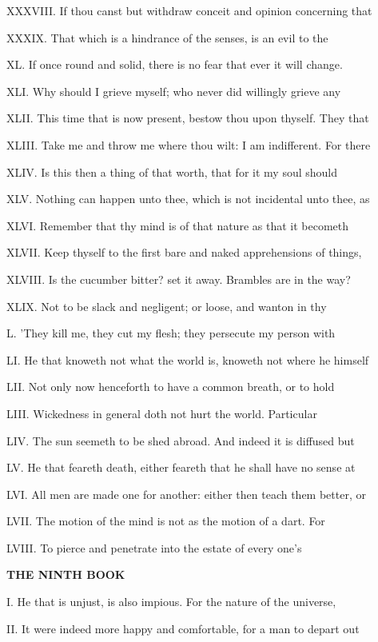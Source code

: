 XXXVIII. If thou canst but withdraw conceit
and opinion concerning that

XXXIX. That which is a hindrance of the
senses, is an evil to the

XL. If once round and solid, there is no fear
that ever it will change.

XLI. Why should I grieve myself; who never did
willingly grieve any

XLII. This time that is now present, bestow
thou upon thyself. They that

XLIII. Take me and throw me where thou wilt: I
am indifferent. For there

XLIV. Is this then a thing of that worth, that
for it my soul should

XLV. Nothing can happen unto thee, which is
not incidental unto thee, as

XLVI. Remember that thy mind is of that nature
as that it becometh

XLVII. Keep thyself to the first bare and
naked apprehensions of things,

XLVIII. Is the cucumber bitter? set it away.
Brambles are in the way?

XLIX. Not to be slack and negligent; or loose,
and wanton in thy

L. 'They kill me, they cut my flesh; they
persecute my person with

LI. He that knoweth not what the world is,
knoweth not where he himself

LII. Not only now henceforth to have a common
breath, or to hold

LIII. Wickedness in general doth not hurt the
world. Particular

LIV. The sun seemeth to be shed abroad. And
indeed it is diffused but

LV. He that feareth death, either feareth that
he shall have no sense at

LVI. All men are made one for another: either
then teach them better, or

LVII. The motion of the mind is not as the
motion of a dart. For

LVIII. To pierce and penetrate into the estate
of every one's

\textbf{THE NINTH BOOK}

I. He that is unjust, is also impious. For the
nature of the universe,

II. It were indeed more happy and comfortable,
for a man to depart out

